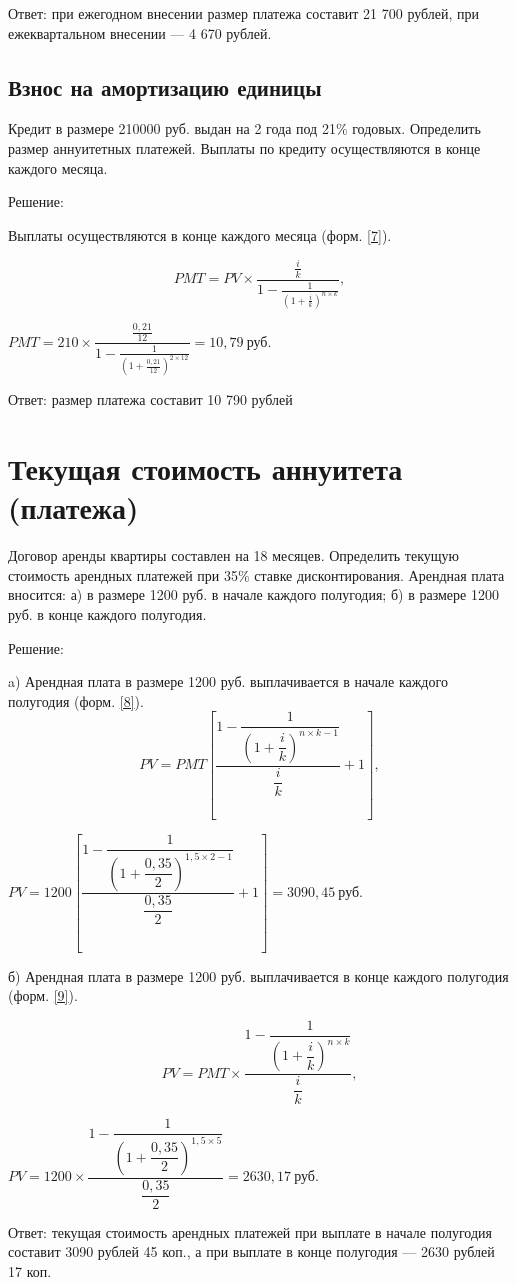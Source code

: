 Ответ: при ежегодном внесении размер платежа составит 21 700 рублей, при ежеквартальном внесении --- 4 670 рублей.

\subsection{Взнос на амортизацию единицы}

Кредит в размере 210000 руб. выдан на 2 года под 21\% годовых. 
Определить размер аннуитетных платежей. Выплаты по кредиту осуществляются в конце каждого месяца.

Решение:

Выплаты осуществляются в конце каждого месяца (форм. \ref{7}).

\begin{equation}\label{7}
PMT =PV \times\dfrac{\frac{i}{k}}{1-\frac{1}{(1+\frac{i}{k})^{n \times k}}},
\end{equation}

$ PMT =210 \times\dfrac{\frac{0,21}{12}}{1-\frac{1}{(1+\frac{0,21}{12})^{2 \times 12}}} = 10,79\  \text{руб.} $

Ответ: размер платежа составит 10 790 рублей

\section{Текущая стоимость аннуитета (платежа)}

Договор аренды квартиры составлен на 18 месяцев. Определить текущую стоимость арендных платежей при 35\% ставке дисконтирования. Арендная плата вносится: а) в размере 1200 руб. в начале каждого полугодия; б) в размере 1200 руб. в конце каждого полугодия.

Решение:

a) Арендная плата в размере 1200 руб. выплачивается в начале каждого полугодия (форм. \ref{8}).
\begin{equation}\label{8}
PV = PMT \left[\dfrac{1-\dfrac{1}{\left(1+\dfrac{i}{k}\right)^{n \times k -1}}}{\dfrac{i}{k}}+1\right],
\end{equation}

$PV = 1200 \left[\dfrac{1-\dfrac{1}{\left(1+\dfrac{0,35}{2}\right)^{1,5 \times 2 -1}}}{\dfrac{0,35}{2}}+1\right] = 3090,45\  \text{руб.} $

б) Арендная плата в размере 1200 руб. выплачивается в конце каждого полугодия (форм. \ref{9}).

\begin{equation}\label{9}
PV = PMT \times \dfrac{1-\dfrac{1}{\left(1+\dfrac{i}{k}\right)^{n \times k}}}{\dfrac{i}{k}},
\end{equation}

$ PV = 1200 \times \dfrac{1-\dfrac{1}{\left(1+\dfrac{0,35}{2}\right)^{1,5 \times 5}}}{\dfrac{0,35}{2}} = 2630,17\  \text{руб.} $

Ответ: текущая стоимость арендных платежей при выплате в начале полугодия составит 3090 рублей 45 коп., а при выплате в конце полугодия --- 2630 рублей 17 коп.

